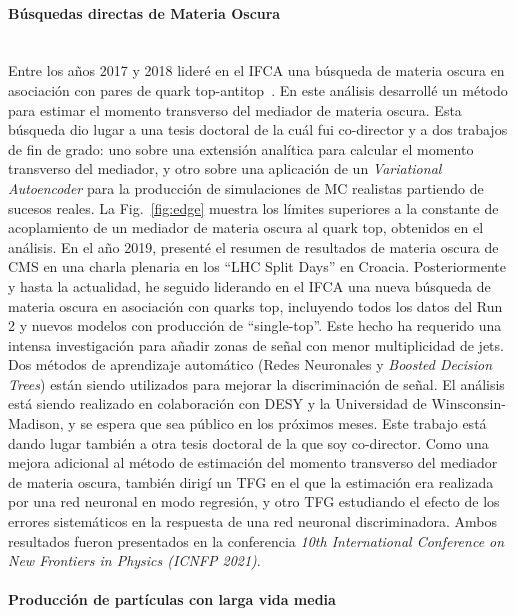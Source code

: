 \paragraph{Búsquedas directas de Materia Oscura\\\\}

Entre los años 2017 y 2018 lideré en el IFCA una búsqueda de materia oscura en asociación con pares de quark top-antitop~\cite{TopDM}. En este análisis desarrollé un método para estimar el momento transverso del mediador de materia oscura. Esta búsqueda dio lugar a una tesis doctoral de la cuál fui co-director y a dos trabajos de fin de grado: uno sobre una extensión analítica para calcular el momento transverso del mediador, y otro sobre una aplicación de un \emph{Variational Autoencoder} para la producción de simulaciones de MC realistas partiendo de sucesos reales. La Fig.~\ref{fig:edge} muestra los límites superiores a la constante de acoplamiento de un mediador de materia oscura al quark top, obtenidos en el análisis. En el año 2019, presenté el resumen de resultados de materia oscura de CMS en una charla plenaria en los “LHC Split Days” en Croacia. Posteriormente y hasta la actualidad, he seguido liderando en el IFCA una nueva búsqueda de materia oscura en asociación con quarks top, incluyendo todos los datos del Run 2 y nuevos modelos con producción de “single-top”. Este hecho ha requerido una intensa investigación para añadir zonas de señal con menor multiplicidad de jets. Dos métodos de aprendizaje automático (Redes Neuronales y \emph{Boosted Decision Trees}) están siendo utilizados para mejorar la discriminación de señal. El análisis está siendo realizado en colaboración con DESY y  la Universidad de Winsconsin-Madison, y se espera que sea público en los próximos meses. Este trabajo está dando lugar también a otra tesis doctoral de la que soy co-director. Como una mejora adicional al método de estimación del momento transverso del mediador de materia oscura, también dirigí un TFG en el que la estimación era realizada por una red neuronal en modo regresión, y otro TFG estudiando el efecto de los errores sistemáticos en la respuesta de una red neuronal discriminadora. Ambos resultados fueron presentados en la conferencia \emph{10th International Conference on New Frontiers in Physics (ICNFP 2021)}.

\paragraph{Producción de partículas con larga vida media\\\\}

